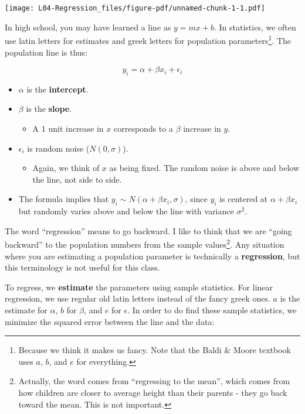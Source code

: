 \documentclass[
  letterpaper,
  DIV=11,
  numbers=noendperiod]{scrreprt}
\providecommand{\tightlist}{%
  \setlength{\itemsep}{0pt}\setlength{\parskip}{0pt}}\usepackage{longtable,booktabs,array}
\begin{document}
\texttt{[image: L04-Regression\_files/figure-pdf/unnamed-chunk-1-1.pdf]}

In high school, you may have learned a line as \(y = mx + b\). In
statistics, we often use latin letters for estimates and greek letters
for population parameters\footnote{Because we think it makes us fancy.
  Note that the Baldi \& Moore textbook uses \(a\), \(b\), and \(e\) for
  everything.}. The population line is thus:

\[
y_i = \alpha + \beta x_i + \epsilon_i
\]

\begin{itemize}
\tightlist
\item
  \(\alpha\) is the \textbf{intercept}.
\item
  \(\beta\) is the \textbf{slope}.

  \begin{itemize}
  \tightlist
  \item
    A 1 unit increase in \(x\) corresponds to a \(\beta\) increase in
    \(y\).
  \end{itemize}
\item
  \(\epsilon_i\) is random noise (\(N(0,\sigma)\)).

  \begin{itemize}
  \tightlist
  \item
    Again, we think of \(x\) as being fixed. The random noise is above
    and below the line, not side to side.
  \end{itemize}
\item
  The formula implies that \(y_i \sim N(\alpha + \beta x_i, \sigma)\),
  since \(y_i\) is centered at \(\alpha + \beta x_i\) but randomly
  varies above and below the line with variance \(\sigma^2\).
\end{itemize}

The word ``regression'' means to go backward. I like to think that we
are ``going backward'' to the population numbers from the sample
values\footnote{Actually, the word comes from ``regressing to the
  mean'', which comes from how children are closer to average height
  than their parents - they go back toward the mean. This is not
  important.}. Any situation where you are estimating a population
parameter is technically a \textbf{regression}, but this terminology is
not useful for this class.

To regress, we \textbf{estimate} the parameters using sample statistics.
For linear regression, we use regular old latin letters instead of the
fancy greek ones. \(a\) is the estimate for \(\alpha\), \(b\) for
\(\beta\), and \(e\) for \(\epsilon\). In order to do find these sample
statistics, we minimize the squared error between the line and the data:
\end{document}

